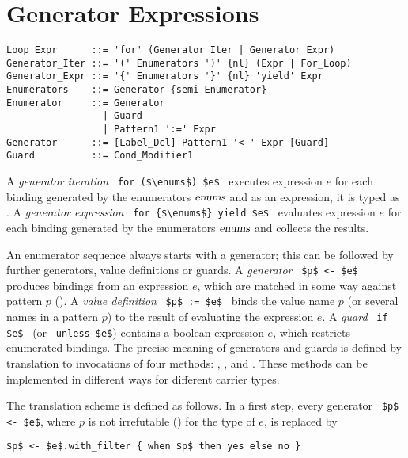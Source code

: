 \section{Generator Expressions}
\label{sec:generator-expressions}

\syntax\begin{lstlisting}
Loop_Expr      ::= 'for' (Generator_Iter | Generator_Expr)
Generator_Iter ::= '(' Enumerators ')' {nl} (Expr | For_Loop)
Generator_Expr ::= '{' Enumerators '}' {nl} 'yield' Expr
Enumerators    ::= Generator {semi Enumerator}
Enumerator     ::= Generator
                 | Guard
                 | Pattern1 ':=' Expr
Generator      ::= [Label_Dcl] Pattern1 '<-' Expr [Guard]
Guard          ::= Cond_Modifier1
\end{lstlisting}

A {\em generator iteration} ~\lstinline!for ($\enums$) $e$!~ executes expression $e$ for each binding generated by the enumerators $\mbox{\sl enums}$ and as an expression, it is typed as . A {\em generator expression} ~\lstinline!for {$\enums$} yield $e$!~ evaluates expression $e$ for each binding generated by the enumerators $\mbox{\sl enums}$ and collects the results.

An enumerator sequence always starts with a generator; this can be followed by further generators, value definitions or guards. A {\em generator} ~\lstinline!$p$ <- $e$!~ produces bindings from an expression $e$, which are matched in some way against pattern $p$ (). A {\em value definition} ~\lstinline!$p$ := $e$!~ binds the value name $p$ (or several names in a pattern $p$) to the result of evaluating the expression $e$. A {\em guard} ~\lstinline!if $e$!~ (or ~\lstinline!unless $e$!) contains a boolean expression $e$, which restricts enumerated bindings. The precise meaning of generators and guards is defined by translation to invocations of four methods: , ,  and . These methods can be implemented in different ways for different carrier types.

The translation scheme is defined as follows. In a first step, every generator ~\lstinline!$p$ <- $e$!, where $p$ is not irrefutable () for the type of $e$, is replaced by 
\begin{lstlisting}
$p$ <- $e$.with_filter { when $p$ then yes else no }
\end{lstlisting}

